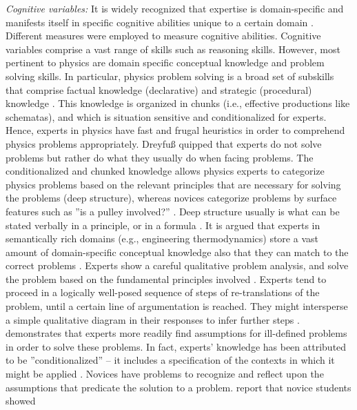 \documentclass[D:/studies/WinnerS/Erhebungen/IPhO1718/paper/problem_solving/main/TaylorFrancis/interactapasample]{subfiles}
\begin{document}


\textit{Cognitive variables:} It is widely recognized that expertise is domain-specific and manifests itself in specific cognitive abilities unique to a certain domain \citep{McClelland.1973,Gardner.1993}. Different measures were employed to measure cognitive abilities. Cognitive variables comprise a vast range of skills such as reasoning skills. However, most pertinent to physics are domain specific conceptual knowledge and problem solving skills. In particular, physics problem solving is a broad set of subskills that comprise factual knowledge (declarative) and strategic (procedural) knowledge \citep{Anderson.1996}. This knowledge is organized in chunks (i.e., effective productions like schematas), and which is situation sensitive and conditionalized for experts. Hence, experts in physics have fast and frugal heuristics in order to comprehend physics problems appropriately. Dreyfuß quipped that experts do not solve problems but rather do what they usually do when facing problems. The conditionalized and chunked knowledge allows physics experts to categorize physics problems based on the relevant principles that are necessary for solving the problems (deep structure), whereas novices categorize problems by surface features such as ''is a pulley involved?'' \citep{Chi.1981}. Deep structure usually is what can be stated verbally in a principle, or in a formula \citep[p. 70]{Schwartz.2015}. It is argued that experts in semantically rich domains (e.g., engineering thermodynamics) store a vast amount of domain-specific conceptual knowledge also \citep{Bhaskar.1977} that they can match to the correct problems \citep{Chi.1981}. Experts show a careful qualitative problem analysis, and solve the problem based on the fundamental principles involved \citep{Larkin.1980,Chi.1981}. Experts tend to proceed in a logically well-posed sequence of steps of re-translations of the problem, until a certain line of argumentation is reached. They might intersperse a simple qualitative diagram in their responses to infer further steps \citep{Larkin.1980,Larkin.1987}. \cite{Fortus.2009} demonstrates that experts more readily find assumptions for ill-defined problems in order to solve these problems. In fact, experts' knowledge has been attributed to be ''conditionalized'' -- it includes a specification of the contexts in which it might be applied \citep{Simon.1980,Glaser.1992}. Novices have problems to recognize and reflect upon the assumptions that predicate the solution to a problem. \cite{Reif.1992} report that novice students showed 
\end{document}
